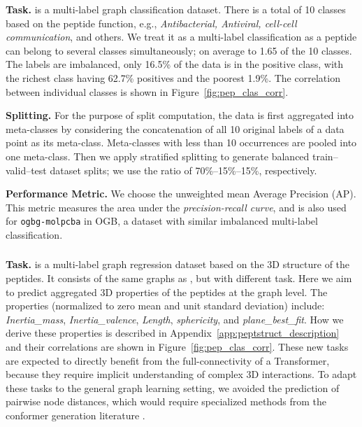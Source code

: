 \documentclass{article}
\begin{document}
\textbf{Task.}
\pepfunc is a multi-label graph classification dataset. There is a total of 10 classes based on the peptide function, e.g., \textit{Antibacterial, Antiviral, cell-cell communication}, and others. We treat it as a multi-label classification as a peptide can belong to several classes simultaneously; on average to 1.65 of the 10 classes. The labels are imbalanced, only 16.5\% of the data is in the positive class, with the richest class having 62.7\% positives and the poorest 1.9\%. The correlation between individual classes is shown in Figure~\ref{fig:pep_clas_corr}.


\textbf{Splitting.}
For the purpose of split computation, the data is first aggregated into meta-classes by considering the concatenation of all 10 original labels of a data point as its meta-class. Meta-classes with less than 10 occurrences are pooled into one meta-class. Then we apply stratified splitting to generate balanced train--valid--test dataset splits; we use the ratio of 70\%--15\%--15\%, respectively.

\textbf{Performance Metric.}
We choose the unweighted mean Average Precision (AP). This metric measures the area under the \textit{precision-recall curve}, and is also used for \texttt{ogbg-molpcba} in OGB, a dataset with similar imbalanced multi-label classification.


\subsubsection{\pepstruct}


\textbf{Task.}
\pepstruct is a multi-label graph regression dataset based on the 3D structure of the peptides. It consists of the same graphs as \pepfunc, but with different task. Here we aim to predict aggregated 3D properties of the peptides at the graph level. 
The properties (normalized to zero mean and unit standard deviation) include: \textit{Inertia\_mass}, \textit{Inertia\_valence}, \textit{Length}, \textit{sphericity}, and \textit{plane\_best\_fit}. How we derive these properties is described in Appendix~\ref{app:peptstruct_description} and their correlations are shown in Figure~\ref{fig:pep_clas_corr}.
These new tasks are expected to directly benefit from the full-connectivity of a Transformer, because they require implicit understanding of complex 3D interactions. To adapt these tasks to the general graph learning setting, we avoided the prediction of pairwise node distances, which would require specialized methods from the conformer generation literature \cite{ganea2021geomol, LearningGradFields, LearningGenerativeDyn_MinkaiXu}.
\end{document}

